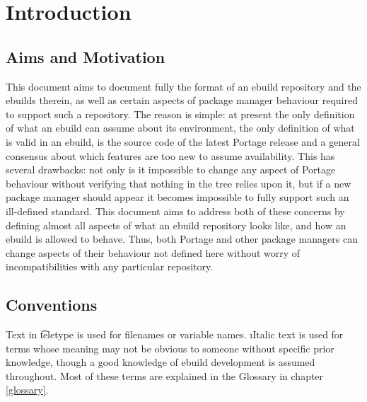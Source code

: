 \chapter{Introduction}

\section{Aims and Motivation}
This document aims to document fully the format of an ebuild repository and the ebuilds therein, as
well as certain aspects of package manager behaviour required to support such a repository. The
reason is simple: at present the only definition of what an ebuild can assume about its environment,
the only definition of what is valid in an ebuild, is the source code of the latest Portage release
and a general consensus about which features are too new to assume availability. This has several
drawbacks: not only is it impossible to change any aspect of Portage behaviour without verifying
that nothing in the tree relies upon it, but if a new package manager should appear it becomes
impossible to fully support such an ill-defined standard. This document aims to address both of
these concerns by defining almost all aspects of what an ebuild repository looks like, and how an
ebuild is allowed to behave. Thus, both Portage and other package managers can change aspects of
their behaviour not defined here without worry of incompatibilities with any particular repository.

\section{Conventions}
Text in \t{teletype} is used for filenames or variable names. \i{Italic} text is used for terms
whose meaning may not be obvious to someone without specific prior knowledge, though a good
knowledge of ebuild development is assumed throughout. Most of these terms are explained in the
Glossary in chapter \ref{glossary}.


